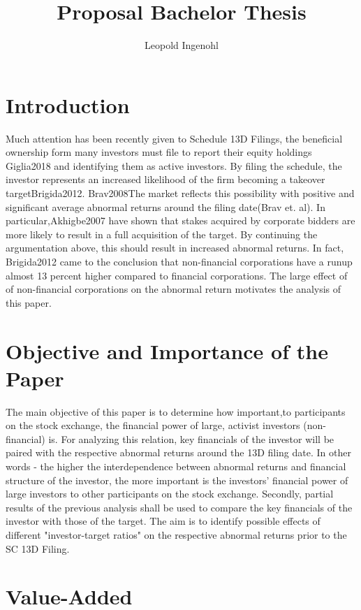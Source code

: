 \documentclass[12pt]{article}
\title{Proposal Bachelor Thesis}
\author{Leopold Ingenohl}
\begin{document}
\maketitle

\section{Introduction}
Much attention has been recently given to Schedule 13D Filings, the beneficial ownership form many investors must file to report their equity holdings {Giglia2018} and identifying them as active investors. By filing the schedule, the investor represents an increased likelihood of the firm becoming a takeover target{Brigida2012}. {Brav2008}The market reflects this possibility with positive and significant average abnormal returns around the filing date(Brav et. al).
In particular,{Akhigbe2007} have shown that stakes acquired by corporate bidders are more likely to result in a full acquisition of the target. By continuing the argumentation above, this should result in increased abnormal returns.  In fact, {Brigida2012} came  to the conclusion that non-financial corporations have a runup  almost 13 percent higher compared to financial corporations. The large effect of of non-financial corporations on the abnormal return motivates the analysis of this paper.


\section{Objective and Importance of the Paper}
The main objective of this paper is to determine how important,to participants on the stock exchange, the financial power of large, activist investors (non-financial) is. For analyzing this relation, key financials of the investor will be paired with the respective abnormal returns around the 13D filing date. In other words - the higher the interdependence between abnormal returns and financial structure of the investor, the more important is the investors' financial power of large investors to other participants on the stock exchange.
Secondly, partial results of the previous analysis shall be used to compare the key financials of the investor with those of the target. The aim is to identify possible effects of different "investor-target ratios" on the respective abnormal returns prior to the SC 13D Filing. 

\section{Value-Added}
\end{document}
